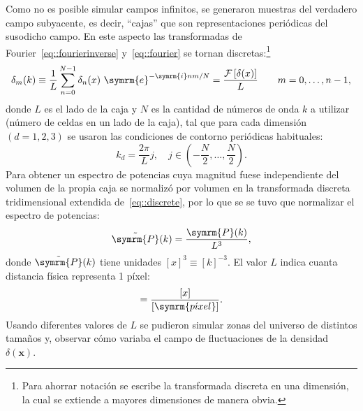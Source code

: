 Como no es posible simular campos infinitos, se generaron muestras del verdadero campo subyacente, es decir, ``cajas'' que son representaciones periódicas del susodicho campo. En este aspecto las transformadas de Fourier~\eqref{eq::fourierinverse} y~\eqref{eq::fourier} se tornan discretas:\footnote{Para ahorrar notación se escribe la transformada discreta en una dimensión, la cual se extiende a mayores dimensiones de manera obvia.}
\begin{equation}
    \delta_m(k)\equiv\frac{1}{L}\sum_{n=0}^{N-1}\delta_n(x)\ \symrm{e}^{-\symrm{i}nm/N}=\frac{\mathcal{F}\left[\delta({x})\right]}{L}\qquad m=0,\ldots,n-1,\label{eq::discrete}
\end{equation}
donde \(L\) es el lado de la caja y \(N\) es la cantidad de números de onda \(k\) a utilizar (número de celdas en un lado de la caja), tal que para cada dimensión \((d=1,2,3)\) se usaron las condiciones de contorno periódicas habituales:
\begin{equation}
    k_d=\frac{2\pi}{L}j,\quad j\in\left(-\frac{N}{2},\ldots,\frac{N}{2}\right).\label{eq::knumbers}
\end{equation}
Para obtener un espectro de potencias cuya magnitud fuese independiente del volumen de la propia caja se normalizó por volumen en la transformada discreta tridimensional extendida de~\eqref{eq::discrete}, por lo que se se tuvo que normalizar el espectro de potencias:
\begin{equation}
    \tilde{\symrm{P}}(k)=\frac{\symrm{P}(k)}{L^3},
\end{equation}
donde \(\tilde{\symrm{P}}(k)\) tiene unidades \([x]^3\equiv[k]^{-3}\). El valor \(L\) indica cuanta distancia física representa 1 píxel:
\begin{equation}
    [L]=\frac{[x]}{[\symrm{p\acute{\imath}xel}]}.
\end{equation}
Usando diferentes valores de \(L\) se pudieron simular zonas del universo de distintos tamaños y, observar cómo variaba el campo de fluctuaciones de la densidad \(\delta(\symbf{x})\).
